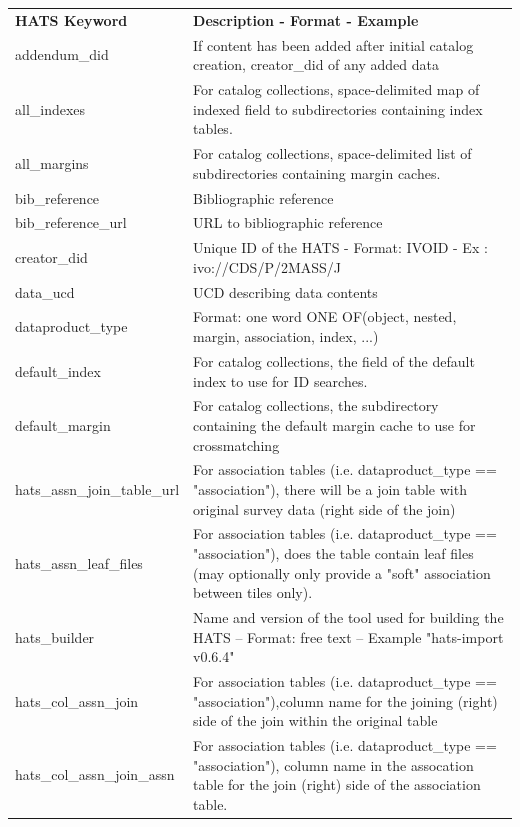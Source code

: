 \documentclass[11pt,a4paper]{ivoa}
\begin{document}
\footnotesize\begin{longtable}[h!]{D{0.33\textwidth} D{0.67\textwidth}}
\sptablerule
\textbf{HATS Keyword}&\textbf{Description - Format - Example}\\
\sptablerule
\endhead

addendum\_did &If content has been added after initial catalog creation, creator\_did of any added data \\
all\_indexes &For catalog collections, space-delimited map of indexed field to subdirectories containing index tables. \\
all\_margins &For catalog collections, space-delimited list of subdirectories containing margin caches. \\
bib\_reference &Bibliographic reference \\
bib\_reference\_url &URL to bibliographic reference \\
creator\_did &Unique ID of the HATS - Format: IVOID - Ex : ivo://CDS/P/2MASS/J \\
data\_ucd &UCD describing data contents \\
dataproduct\_type &Format: one word ONE OF(object, nested, margin, association, index, ...) \\
default\_index &For catalog collections, the field of the default index to use for ID searches. \\
default\_margin &For catalog collections, the subdirectory containing the default margin cache to use for crossmatching \\
hats\_assn\_join\_table\_url &For association tables (i.e. dataproduct\_type == "association"), there will be a join table with original survey data (right side of the join) \\
hats\_assn\_leaf\_files &For association tables (i.e. dataproduct\_type == "association"), does the table contain leaf files (may optionally only provide a "soft" association between tiles only). \\
hats\_builder &Name and version of the tool used for building the HATS – Format: free text -- Example "hats-import v0.6.4" \\
hats\_col\_assn\_join &For association tables (i.e. dataproduct\_type == "association"),column name for the joining (right) side of the join within the original table \\
hats\_col\_assn\_join\_assn &For association tables (i.e. dataproduct\_type == "association"), column name in the assocation table for the join (right) side of the association table. \\

\end{longtable}
\end{document}
